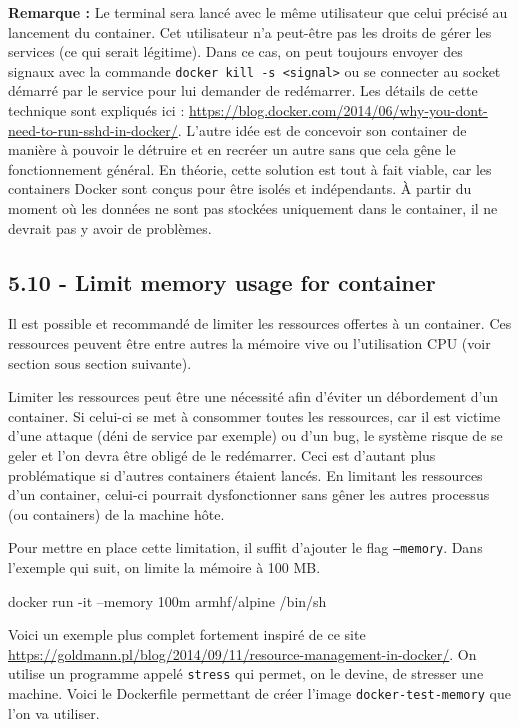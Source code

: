 \documentclass[11pt,a4paper,oneside]{report}
\newcommand{\code}[1]{\texttt{#1}}
\begin{document}
\textbf{Remarque : } Le terminal sera lancé avec le même utilisateur que celui précisé au lancement du container. Cet utilisateur n'a peut-être pas les droits de gérer les services (ce qui serait légitime). Dans ce cas, on peut toujours envoyer des signaux avec la commande \code{docker kill -s <signal>} ou se connecter au socket démarré par le service pour lui demander de redémarrer. Les détails de cette technique sont expliqués ici : \url{https://blog.docker.com/2014/06/why-you-dont-need-to-run-sshd-in-docker/}. L'autre idée est de concevoir son container de manière à pouvoir le détruire et en recréer un autre sans que cela gêne le fonctionnement général. En théorie, cette solution est tout à fait viable, car les containers Docker sont conçus pour être isolés et indépendants. À partir du moment où les données ne sont pas stockées uniquement dans le container, il ne devrait pas y avoir de problèmes.

\subsection{5.10 - Limit memory usage for container}
Il est possible et recommandé de limiter les ressources offertes à un container. Ces ressources peuvent être entre autres la mémoire vive ou l'utilisation CPU (voir section sous section suivante).

Limiter les ressources peut être une nécessité afin d'éviter un débordement d'un container. Si celui-ci se met à consommer toutes les ressources, car il est victime d'une attaque (déni de service par exemple) ou d'un bug, le système risque de se geler et l'on devra être obligé de le redémarrer. Ceci est d'autant plus problématique si d'autres containers étaient lancés. En limitant les ressources d'un container, celui-ci pourrait dysfonctionner sans gêner les autres processus (ou containers) de la machine hôte.

Pour mettre en place cette limitation, il suffit d'ajouter le flag \code{--memory}. Dans l'exemple qui suit, on limite la mémoire à 100 MB.

\begin{bashcode}
docker run -it --memory 100m armhf/alpine /bin/sh
\end{bashcode}

Voici un exemple plus complet fortement inspiré de ce site \url{https://goldmann.pl/blog/2014/09/11/resource-management-in-docker/}. On utilise un programme appelé \code{stress} qui permet, on le devine, de stresser une machine. Voici le Dockerfile permettant de créer l'image \code{docker-test-memory} que l'on va utiliser.
\end{document}

